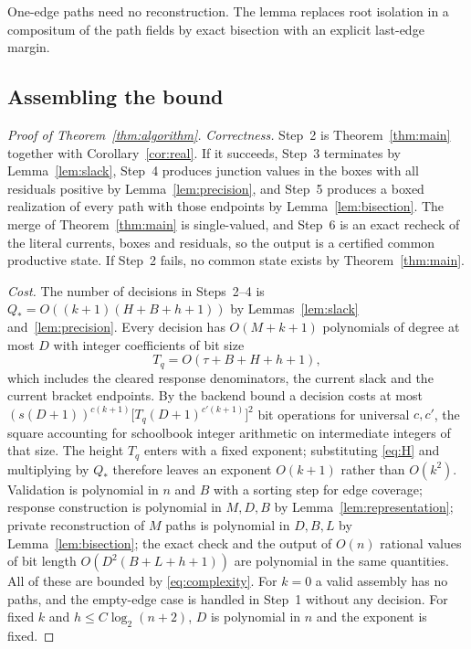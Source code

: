 \documentclass[11pt,a4paper]{article}
\theoremstyle{plain}
\theoremstyle{definition}
\theoremstyle{remark}
\begin{document}
One-edge paths need no reconstruction. The lemma replaces root isolation in a compositum of the path fields by exact bisection with an explicit last-edge margin.

\subsection{Assembling the bound}

\begin{proof}[Proof of Theorem~\ref{thm:algorithm}]
\emph{Correctness.} Step~2 is Theorem~\ref{thm:main} together with Corollary~\ref{cor:real}. If it succeeds, Step~3 terminates by Lemma~\ref{lem:slack}, Step~4 produces junction values in the boxes with all residuals positive by Lemma~\ref{lem:precision}, and Step~5 produces a boxed realization of every path with those endpoints by Lemma~\ref{lem:bisection}. The merge of Theorem~\ref{thm:main} is single-valued, and Step~6 is an exact recheck of the literal currents, boxes and residuals, so the output is a certified common productive state. If Step~2 fails, no common state exists by Theorem~\ref{thm:main}.

\emph{Cost.} The number of decisions in Steps~2--4 is $Q_*=O((k+1)(H+B+h+1))$ by Lemmas~\ref{lem:slack} and~\ref{lem:precision}. Every decision has $O(M+k+1)$ polynomials of degree at most $D$ with integer coefficients of bit size
\[
  T_q=O(\tau+B+H+h+1),
\]
which includes the cleared response denominators, the current slack and the current bracket endpoints. By the backend bound a decision costs at most $(s(D+1))^{c(k+1)}\bigl[T_q(D+1)^{c'(k+1)}\bigr]^2$ bit operations for universal $c,c'$, the square accounting for schoolbook integer arithmetic on intermediate integers of that size. The height $T_q$ enters with a fixed exponent; substituting \eqref{eq:H} and multiplying by $Q_*$ therefore leaves an exponent $O(k+1)$ rather than $O(k^2)$. Validation is polynomial in $n$ and $B$ with a sorting step for edge coverage; response construction is polynomial in $M,D,B$ by Lemma~\ref{lem:representation}; private reconstruction of $M$ paths is polynomial in $D,B,L$ by Lemma~\ref{lem:bisection}; the exact check and the output of $O(n)$ rational values of bit length $O(D^2(B+L+h+1))$ are polynomial in the same quantities. All of these are bounded by \eqref{eq:complexity}. For $k=0$ a valid assembly has no paths, and the empty-edge case is handled in Step~1 without any decision. For fixed $k$ and $h\le C\log_2(n+2)$, $D$ is polynomial in $n$ and the exponent is fixed.
\end{proof}
\end{document}
